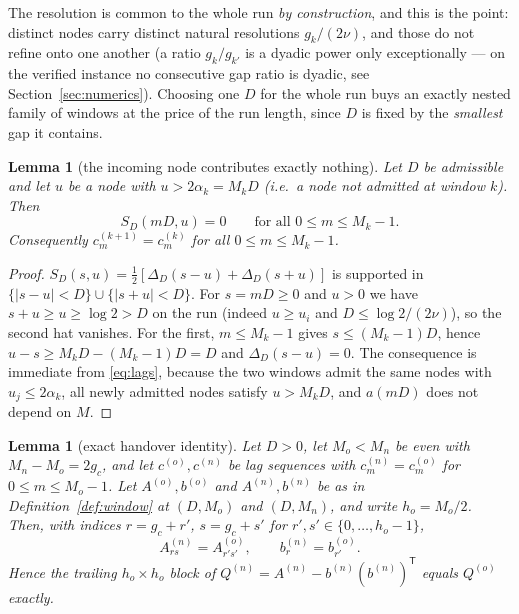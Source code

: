 \documentclass[11pt,a4paper]{article}
\theoremstyle{plain}
\newtheorem{lemma}[theorem]{Lemma}
\theoremstyle{definition}
\newcommand{\T}{\mathsf{T}}
\begin{document}
The resolution is common to the whole run \emph{by construction}, and this is the
point: distinct nodes carry distinct natural resolutions $g_{k}/(2\nu)$, and those do
not refine onto one another (a ratio $g_{k}/g_{k'}$ is a dyadic power only
exceptionally --- on the verified instance no consecutive gap ratio is dyadic, see
Section~\ref{sec:numerics}). Choosing one $D$ for the whole run buys an exactly
nested family of windows at the price of the run length, since $D$ is fixed by the
\emph{smallest} gap it contains.

\begin{lemma}[the incoming node contributes exactly nothing]
\label{lem:zeroblock}
Let $D$ be admissible and let $u$ be a node with $u>2\alpha_{k}=M_{k}D$ (i.e.\ a node
not admitted at window $k$). Then
\begin{equation}
\label{eq:zero}
  S_{D}(mD,u)=0\qquad\text{for all }0\le m\le M_{k}-1 .
\end{equation}
Consequently $c^{(k+1)}_{m}=c^{(k)}_{m}$ for all $0\le m\le M_{k}-1$.
\end{lemma}

\begin{proof}
$S_{D}(s,u)=\tfrac12[\Delta_{D}(s-u)+\Delta_{D}(s+u)]$ is supported in
$\{|s-u|<D\}\cup\{|s+u|<D\}$. For $s=mD\ge0$ and $u>0$ we have $s+u\ge u\ge\log 2>D$
on the run (indeed $u\ge u_{i}$ and $D\le\log2/(2\nu)$), so the second hat vanishes.
For the first, $m\le M_{k}-1$ gives $s\le (M_{k}-1)D$, hence
$u-s\ge M_{k}D-(M_{k}-1)D=D$ and $\Delta_{D}(s-u)=0$. The consequence is immediate
from \eqref{eq:lags}, because the two windows admit the same nodes with
$u_{j}\le 2\alpha_{k}$, all newly admitted nodes satisfy $u>M_{k}D$, and $a(mD)$ does
not depend on $M$.
\end{proof}

\begin{lemma}[exact handover identity]
\label{lem:handover}
Let $D>0$, let $M_{o}<M_{n}$ be even with $M_{n}-M_{o}=2g_{c}$, and let
$c^{(o)},c^{(n)}$ be lag sequences with $c^{(n)}_{m}=c^{(o)}_{m}$ for
$0\le m\le M_{o}-1$. Let $A^{(o)},b^{(o)}$ and $A^{(n)},b^{(n)}$ be as in
Definition~\ref{def:window} at $(D,M_{o})$ and $(D,M_{n})$, and write $h_{o}=M_{o}/2$.
Then, with indices $r=g_{c}+r'$, $s=g_{c}+s'$ for $r',s'\in\{0,\dots,h_{o}-1\}$,
\begin{equation}
\label{eq:handover}
  A^{(n)}_{rs}=A^{(o)}_{r's'},
  \qquad
  b^{(n)}_{r}=b^{(o)}_{r'} .
\end{equation}
Hence the trailing $h_{o}\times h_{o}$ block of $Q^{(n)}=A^{(n)}-b^{(n)}(b^{(n)})^{\T}$
equals $Q^{(o)}$ exactly.
\end{lemma}
\end{document}

